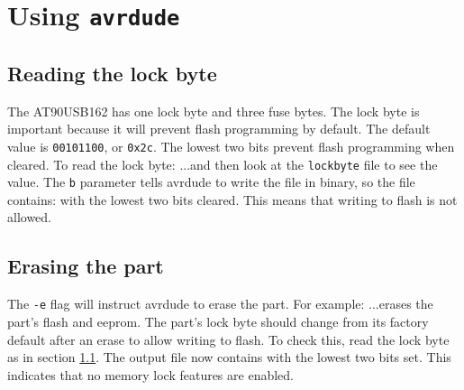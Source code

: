 \section{Using \texttt{avrdude}}


\subsection{Reading the lock byte}
\label{readlock}
The AT90USB162 has one lock byte and three fuse bytes.  The lock byte 
is important because it will prevent flash programming by default.  
The default value is \texttt{00101100}, or \texttt{0x2c}.  The lowest 
two bits prevent flash programming when cleared.  To read the lock byte:
%
%
...and then look at the \texttt{lockbyte} file to see the value.  The 
\texttt{b} parameter tells avrdude to write the file in binary, so the 
file contains:
with the lowest two bits cleared.  This means that writing to flash is 
not allowed.

\clearpage
\subsection{Erasing the part}
The \texttt{-e} flag will instruct avrdude to erase the part.  For 
example:
%
%
...erases the part's flash and eeprom.  The part's lock byte should 
change from its factory default after an erase to allow writing to 
flash.  To check this, read the lock byte as in section 
\ref{readlock}.  The output file now contains
with the lowest two bits set.  This indicates that no memory lock 
features are enabled.
